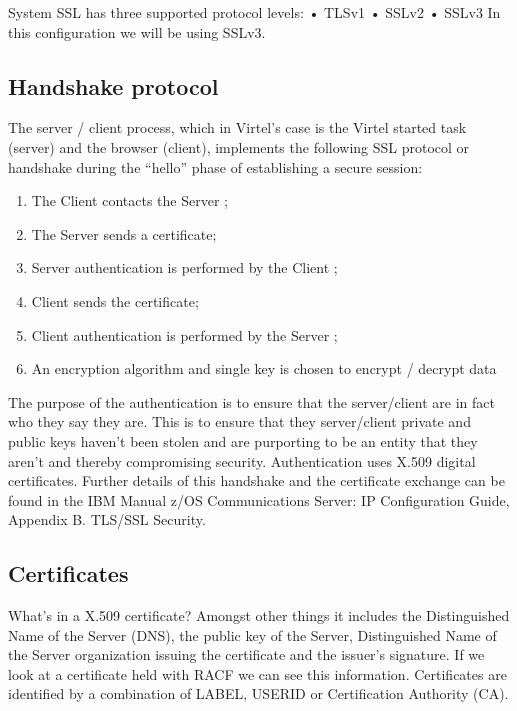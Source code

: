 \documentclass[letterpaper,10pt,english]{sphinxmanual}
\begin{document}
System SSL has three supported protocol levels:
• TLSv1
• SSLv2
• SSLv3
In this configuration we will be using SSLv3.


\subsection{Handshake protocol}
\label{\detokenize{TN202002:handshake-protocol}}
The server / client process, which in Virtel’s case is the Virtel started task (server) and the browser (client), implements the following SSL protocol or handshake during the “hello” phase of establishing a secure session:
\begin{enumerate}
\def\theenumi{\arabic{enumi}}
\def\labelenumi{\theenumi .}
\makeatletter\def\p@enumii{\p@enumi \theenumi .}\makeatother
\item {} 
The Client contacts the Server ;

\item {} 
The Server sends a certificate;

\item {} 
Server authentication is performed by the Client ;

\item {} 
Client sends the certificate;

\item {} 
Client authentication is performed by the Server ;

\item {} 
An encryption algorithm and single key is chosen to encrypt / decrypt data

\end{enumerate}

The purpose of the authentication is to ensure that the server/client are in fact who they say they are. This is to ensure that they server/client private and public keys haven’t been stolen and are purporting to be an entity that they aren’t and thereby compromising security. Authentication uses X.509 digital certificates. Further details of this handshake and the certificate exchange can be found in the IBM Manual z/OS Communications Server: IP Configuration Guide, Appendix B. TLS/SSL Security.


\subsection{Certificates}
\label{\detokenize{TN202002:certificates}}
What’s in a X.509 certificate? Amongst other things it includes the Distinguished Name of the Server (DNS), the public key of the Server, Distinguished Name of the Server organization issuing the certificate and the issuer’s signature. If we look at a certificate held with RACF we can see this information. Certificates are identified by a combination of LABEL, USERID or
Certification Authority (CA).
\end{document}
